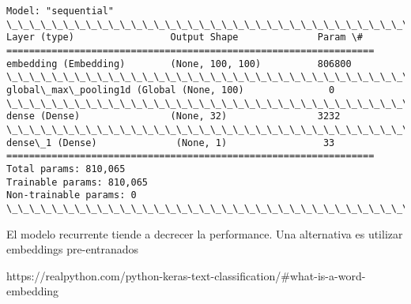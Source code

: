 \documentclass[11pt]{article}
\begin{document}
    \begin{Verbatim}[commandchars=\\\{\}]
Model: "sequential"
\_\_\_\_\_\_\_\_\_\_\_\_\_\_\_\_\_\_\_\_\_\_\_\_\_\_\_\_\_\_\_\_\_\_\_\_\_\_\_\_\_\_\_\_\_\_\_\_\_\_\_\_\_\_\_\_\_\_\_\_\_\_\_\_\_
Layer (type)                 Output Shape              Param \#   
=================================================================
embedding (Embedding)        (None, 100, 100)          806800    
\_\_\_\_\_\_\_\_\_\_\_\_\_\_\_\_\_\_\_\_\_\_\_\_\_\_\_\_\_\_\_\_\_\_\_\_\_\_\_\_\_\_\_\_\_\_\_\_\_\_\_\_\_\_\_\_\_\_\_\_\_\_\_\_\_
global\_max\_pooling1d (Global (None, 100)               0         
\_\_\_\_\_\_\_\_\_\_\_\_\_\_\_\_\_\_\_\_\_\_\_\_\_\_\_\_\_\_\_\_\_\_\_\_\_\_\_\_\_\_\_\_\_\_\_\_\_\_\_\_\_\_\_\_\_\_\_\_\_\_\_\_\_
dense (Dense)                (None, 32)                3232      
\_\_\_\_\_\_\_\_\_\_\_\_\_\_\_\_\_\_\_\_\_\_\_\_\_\_\_\_\_\_\_\_\_\_\_\_\_\_\_\_\_\_\_\_\_\_\_\_\_\_\_\_\_\_\_\_\_\_\_\_\_\_\_\_\_
dense\_1 (Dense)              (None, 1)                 33        
=================================================================
Total params: 810,065
Trainable params: 810,065
Non-trainable params: 0
\_\_\_\_\_\_\_\_\_\_\_\_\_\_\_\_\_\_\_\_\_\_\_\_\_\_\_\_\_\_\_\_\_\_\_\_\_\_\_\_\_\_\_\_\_\_\_\_\_\_\_\_\_\_\_\_\_\_\_\_\_\_\_\_\_

    \end{Verbatim}

    El modelo recurrente tiende a decrecer la performance. Una alternativa
es utilizar embeddings pre-entranados

https://realpython.com/python-keras-text-classification/\#what-is-a-word-embedding
\end{document}
